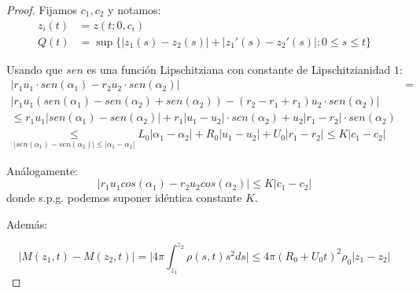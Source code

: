 \documentclass[a4paper,10pt]{scrartcl}
\theoremstyle{definition}
\numberwithin{equation}{section}
\begin{document}
\begin{proof}
 Fijamos $c_1, c_2$ y notamos:
 \begin{align*}
    z_i(t) &= z(t; 0, c_i)\\
    Q(t) &= \sup\{|z_1(s) - z_2(s)| + |z_1'(s) - z_2'(s)|: 0 \le s \le t\}
 \end{align*}
 
 
 Usando que $sen$ es una función Lipschitziana con constante de Lipschitzianidad $1$:
 \begin{align}
 \bigg|r_1 u_1 \cdot sen(\alpha_1) - r_2 u_2 \cdot sen(\alpha_2)\bigg| &= \nonumber\\
 \bigg|r_1 u_1 (sen(\alpha_1) - sen(\alpha_2) + sen(\alpha_2)) - (r_2 - r_1 + r_1) u_2 \cdot sen(\alpha_2)\bigg| \nonumber \\
 \le r_1 u_1 \bigg|sen(\alpha_1) - sen(\alpha_2)\bigg| + r_1\bigg|u_1 - u_2\bigg| \cdot sen(\alpha_2) + u_2\bigg|r_1 - r_2\bigg| \cdot sen(\alpha_2) \nonumber\\
 \underset{|sen(\alpha_1) - sen(\alpha_2)| \le |\alpha_1 - \alpha_2|}{\le} L_0|\alpha_1 - \alpha_2| + R_0|u_1 - u_2| + U_0|r_1 - r_2| \le K|c_1 - c_2|
 \label{ineq:sins}
 \end{align}
 
 Análogamente:
 \[
  \bigg|r_1 u_1 cos(\alpha_1) - r_2 u_2 cos(\alpha_2)\bigg| \le K|c_1 - c_2|
 \]
 donde s.p.g. podemos suponer idéntica constante $K$.
 
 Además:
 
\[
 |M(z_1, t) - M(z_2, t)| = \bigg|4\pi \int_{z_1}^{z_2} \rho(s,t) s^2 ds \bigg| \le 4\pi(R_0 + U_0t)^2 \rho_0 |z_1 - z_2|
\]


\end{proof}
\end{document}
